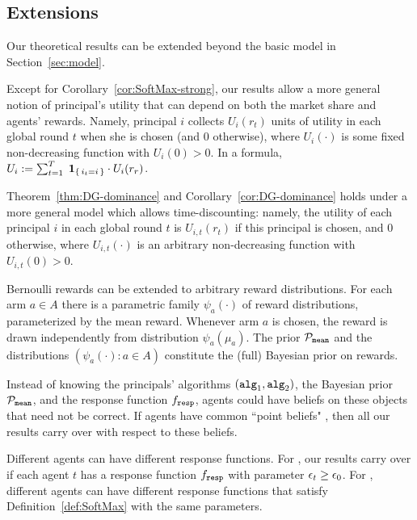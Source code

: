 \subsection{Extensions}
\label{sec:theory-extensions}

Our theoretical results can be extended beyond the basic model in Section~\ref{sec:model}.


Except for Corollary~\ref{cor:SoftMax-strong}, our results allow a more general notion of principal's utility that can depend on both the market share and agents' rewards. Namely, principal $i$ collects $U_i(r_t)$ units of utility in each global round $t$ when she is chosen (and $0$ otherwise), where $U_i(\cdot)$ is some fixed non-decreasing function with $U_i(0)>0$. In a formula,
$U_i := \sum_{t=1}^T\; \indicator{i_t=i}\cdot U_i(r_r)$.

Theorem~\ref{thm:DG-dominance} and Corollary~\ref{cor:DG-dominance} holds under a more general model which allows time-discounting: namely, the utility of each principal $i$ in each global round $t$ is $U_{i,t}(r_t)$ if this principal is chosen, and $0$ otherwise, where $U_{i,t}(\cdot)$ is an arbitrary non-decreasing function with $U_{i,t}(0)>0$.

Bernoulli rewards can be extended to arbitrary reward distributions. For each arm $a\in A$ there is a parametric family $\psi_a(\cdot)$ of reward distributions, parameterized by the mean reward. Whenever arm $a$ is chosen, the reward is drawn independently from distribution $\psi_a(\mu_a)$. The prior $\priorMu$ and the distributions $(\psi_a(\cdot)\colon a\in A)$ constitute the (full) Bayesian prior on rewards.%

Instead of knowing the principals' algorithms $(\alg[1],\alg[2])$, the Bayesian prior $\priorMu$, and the response function $\respF$, agents could have beliefs on these objects that need not be correct. If agents have common ``point beliefs" %
, then all our results carry over with respect to these beliefs.

Different agents can have different response functions. For \HardMaxRandom, our results carry over if each agent $t$ has a \HardMaxRandom response function $\respF$ with parameter $\eps_t\geq \eps_0$. For \SoftMaxRandom, different agents can have different response functions that satisfy Definition~\ref{def:SoftMax} with the same parameters.

